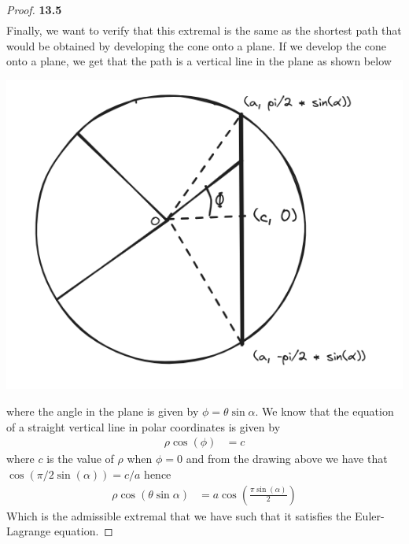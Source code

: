 \documentclass[11pt]{article}
\theoremstyle{definition}
\begin{document}
\begin{proof}{\textbf{13.5}}
\begin{align*}
    \end{align*}
    \cleardoublepage
    Finally, we want to verify that this extremal is the same as the shortest
    path that would be obtained by developing the cone onto a plane.
    If we develop the cone onto a plane, we get that the path is a vertical
    line in the plane as shown below
    \begin{center}
        \includegraphics[scale=0.4]{ch13-5_1.png}
    \end{center}
    where the angle in the plane is given by $\phi = \theta \sin\alpha$.
    We know that the equation of a straight vertical line in polar coordinates
    is given by
    \begin{align*}
        \rho\cos(\phi) &= c
    \end{align*}
    where $c$ is the value of $\rho$ when $\phi = 0$ and from the drawing
    above we have that $\cos(\pi/2\sin(\alpha)) = c/a$ hence 
    \begin{align*}
        \rho\cos(\theta\sin\alpha) &= a\cos(\frac{\pi\sin(\alpha)}{2})
    \end{align*}
    Which is the admissible extremal that we have such that it satisfies
    the Euler-Lagrange equation.
\end{proof}
\end{document}
